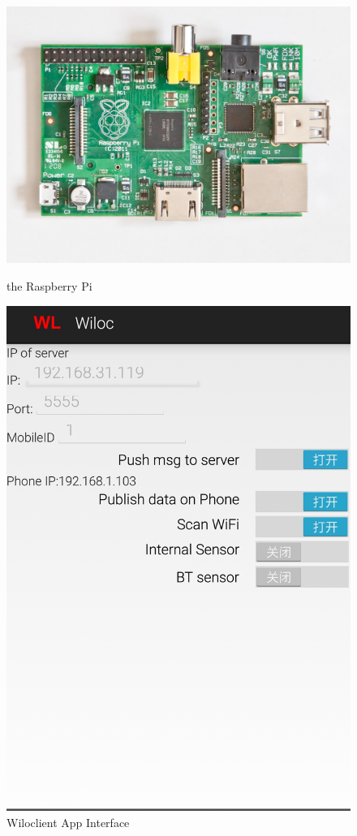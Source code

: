\documentclass[10pt,conference]{IEEEtran}
\begin{document}
\begin{figure}[htbp]
\begin{minipage}[t]{0.5\textwidth}
	\centering
	\includegraphics[scale=0.1]{Pi}
	\caption{the Raspberry Pi}\label{Pi}
\end{minipage}
\begin{minipage}[t]{0.5\textwidth}
	\centering
	\includegraphics[scale=0.1]{app}
	\caption{Wiloclient App Interface}\label{wiloc}
\end{minipage}
\end{figure}
\end{document}
